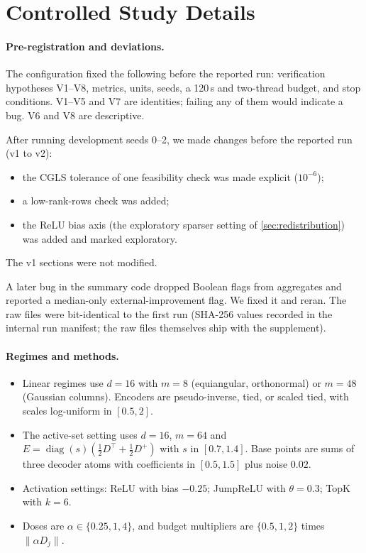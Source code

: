 \documentclass{article}
\theoremstyle{plain}
\theoremstyle{definition}
\theoremstyle{remark}
\begin{document}
\section{Controlled Study Details}
\label{app:toy}
\paragraph{Pre-registration and deviations.}
The configuration fixed the following before the reported run: verification hypotheses
V1--V8, metrics, units, seeds, a 120\,s and two-thread budget, and stop conditions.
V1--V5 and V7 are identities; failing any of them would indicate a bug. V6 and V8 are
descriptive.

After running development seeds 0--2, we made changes before the reported run (v1 to
v2):
\begin{itemize}
  \item the CGLS tolerance of one feasibility check was made explicit ($10^{-6}$);
  \item a low-rank-rows check was added;
  \item the ReLU bias axis (the exploratory sparser setting of \cref{sec:redistribution}) was
  added and marked exploratory.
\end{itemize}
The v1 sections were not modified.

A later bug in the summary code dropped Boolean flags from aggregates and reported a
median-only external-improvement flag. We fixed it and reran. The raw files were
bit-identical to the first run (SHA-256 values recorded in the internal run manifest; the
raw files themselves ship with the supplement).

\paragraph{Regimes and methods.}
\begin{itemize}
  \item Linear regimes use $d=16$ with $m=8$ (equiangular, orthonormal) or $m=48$
  (Gaussian columns). Encoders are pseudo-inverse, tied, or scaled tied, with scales
  log-uniform in $[0.5, 2]$.
  \item The active-set setting uses $d=16$, $m=64$ and
  $E = \operatorname{diag}(s)(\tfrac12D^{\top} + \tfrac12D^{+})$ with $s$ in $[0.7,1.4]$.
  Base points are sums of three decoder atoms with coefficients in $[0.5,1.5]$ plus noise
  $0.02$.
  \item Activation settings: ReLU with bias $-0.25$; JumpReLU with $\theta=0.3$; TopK with
  $k=6$.
  \item Doses are $\alpha\in\{0.25,1,4\}$, and budget multipliers are $\{0.5,1,2\}$ times
  $\|\alpha D_j\|$.
\end{itemize}
\end{document}
